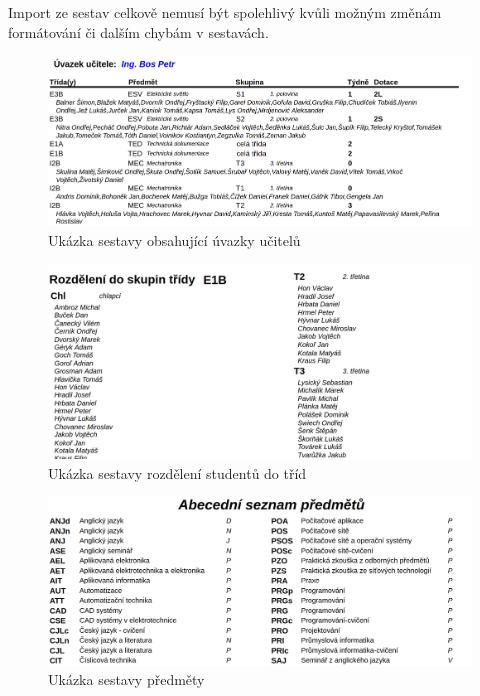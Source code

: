 Import ze sestav celkově nemusí být spolehlivý kvůli možným změnám formátování či dalším chybám v sestavách.
\begin{figure}[h]
    \centering
    \includegraphics[width=1\linewidth]{Figures/uvazky-ucitelu-ukazka.png}
    \caption{Ukázka sestavy obsahující úvazky učitelů}
    \label{fig:uvazky-ucitelu-ukazka}
\end{figure}

\begin{figure}[H]
    \centering
    \includegraphics[width=1\linewidth]{Figures/skupiny-ukazka.png}
    \caption{Ukázka sestavy rozdělení studentů do tříd}
    \label{fig:ukazka-sestavy-tridy}
\newpage

\end{figure}
\begin{figure}[H]

    \centering
    \includegraphics[width=1\linewidth]{Figures/predmety-ukazka.png}
    \caption{Ukázka sestavy předměty}
    \label{fig:ukazka-sestavy-predmety}
    
\end{figure}

